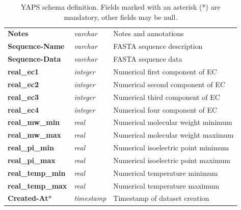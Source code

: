 \begin{table}[H]
\begin{tabular}{| l | l | l |}
\textbf{Notes} & \textit{varchar} & Notes and annotations\\
\textbf{Sequence-Name} & \textit{varchar} & FASTA sequence description\\
\textbf{Sequence-Data} & \textit{varchar} & FASTA sequence data\\
\textbf{real\_ec1} & \textit{integer} & Numerical first component of EC\\
\textbf{real\_ec2} & \textit{integer} & Numerical second component of EC\\
\textbf{real\_ec3} & \textit{integer} & Numerical third component of EC\\
\textbf{real\_ec4} & \textit{integer} & Numerical four component of EC\\
\textbf{real\_mw\_min} & \textit{real} & Numerical molecular weight minimum\\
\textbf{real\_mw\_max} & \textit{real} & Numerical molecular weight maximum\\
\textbf{real\_pi\_min} & \textit{real} & Numerical isoelectric point minimum\\
\textbf{real\_pi\_max} & \textit{real} & Numerical isoelectric point maximum\\
\textbf{real\_temp\_min} & \textit{real} & Numerical temperature minimum\\
\textbf{real\_temp\_max} & \textit{real} & Numerical temperature maximum\\
\textbf{Created-At}* & \textit{timestamp} & Timestamp of dataset creation\\
\hline
\end{tabular}
\caption[YAPS schema]
        {YAPS schema definition. Fields marked with an asterisk (*)
         are mandatory, other fields may be null.}
\label{tab:yaps-schema}
\end{table}




